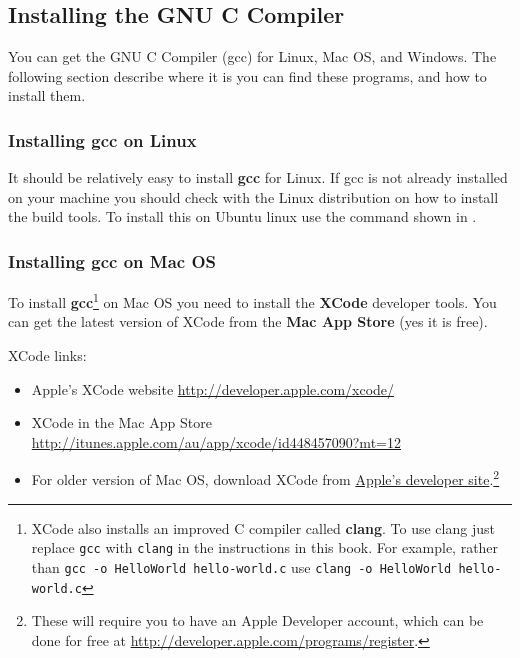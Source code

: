 \subsection{Installing the GNU C Compiler} %
\label{sub:installing_gcc}

You can get the GNU C Compiler (gcc) for Linux, Mac OS, and Windows. The following section describe where it is you can find these programs, and how to install them.

\subsubsection{Installing gcc on Linux} %
\label{ssub:linux}

It should be relatively easy to install \textbf{gcc} for Linux. If gcc is not already installed on your machine you should check with the Linux distribution on how to install the build tools. To install this on Ubuntu linux use the command shown in .



\subsubsection{Installing gcc on Mac OS} %
\label{ssub:installing_gcc_on_mac_os}

To install \textbf{gcc}\footnote{XCode also installs an improved C compiler called \textbf{clang}. To use clang just replace \texttt{gcc} with \texttt{clang} in the instructions in this book. For example, rather than \texttt{gcc -o HelloWorld hello-world.c} use \texttt{clang -o HelloWorld hello-world.c}} on Mac OS you need to install the \textbf{XCode} developer tools. You can get the latest version of XCode from the \textbf{Mac App Store} (yes it is free).

XCode links:
\begin{itemize}
  \item Apple's XCode website \url{http://developer.apple.com/xcode/}
  \item XCode in the Mac App Store  \url{http://itunes.apple.com/au/app/xcode/id448457090?mt=12}
  \item For older version of Mac OS, download XCode from \href{https://developer.apple.com/downloads/download.action?path=Developer_Tools/xcode_3.2.2_developer_tools_beta_20728/xcode322_2148_developerdvd.dmg}{Apple's developer site}.\footnote{These will require you to have an Apple Developer account, which can be done for free at \url{http://developer.apple.com/programs/register}.}
\end{itemize}

